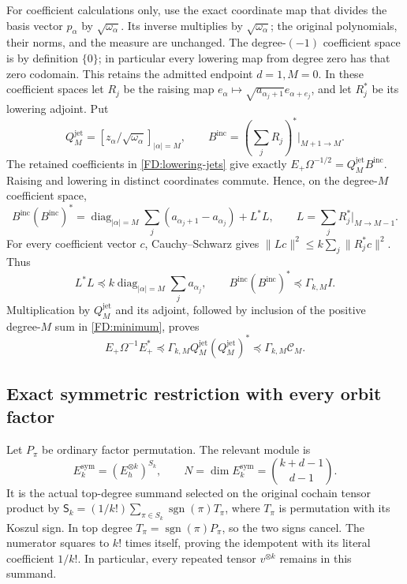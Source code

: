For coefficient calculations only, use the exact coordinate map that
divides the basis vector \(p_\alpha\) by \(\sqrt{\omega_\alpha}\).
Its inverse multiplies by \(\sqrt{\omega_\alpha}\); the original
polynomials, their norms, and the measure are unchanged.
The degree-\((-1)\) coefficient space is by definition \(\{0\}\);
in particular every lowering map from degree zero has that zero
codomain.  This retains the admitted endpoint \(d=1,M=0\).
In these coefficient spaces let \(R_j\) be the raising map
\(e_\alpha\mapsto\sqrt{a_{\alpha_j+1}}e_{\alpha+e_j}\), and let
\(R_j^*\) be its lowering adjoint.  Put
\[
Q_M^{\mathrm{jet}}=[z_\alpha/\sqrt{\omega_\alpha}]_{|\alpha|=M},
\qquad B^{\mathrm{inc}}=(\textstyle\sum_jR_j)^*\big|_{M+1\to M}.
\]
The retained coefficients in \eqref{FD:lowering-jets} give exactly
\(E_+\Omega^{-1/2}=Q_M^{\mathrm{jet}}B^{\mathrm{inc}}\).
Raising and lowering in distinct coordinates commute.  Hence, on the
degree-\(M\) coefficient space,
\[
B^{\mathrm{inc}}(B^{\mathrm{inc}})^*
=\operatorname{diag}_{|\alpha|=M}\sum_j
(a_{\alpha_j+1}-a_{\alpha_j})+L^*L,
\qquad L=\textstyle\sum_j R_j^*\big|_{M\to M-1}.
\]
For every coefficient vector \(c\), Cauchy--Schwarz gives
\(\|Lc\|^2\le k\sum_j\|R_j^*c\|^2\).  Thus
\[
L^*L\preceq k\operatorname{diag}_{|\alpha|=M}\sum_ja_{\alpha_j},
\qquad
B^{\mathrm{inc}}(B^{\mathrm{inc}})^*\preceq\Gamma_{k,M}I.
\]
Multiplication by \(Q_M^{\mathrm{jet}}\) and its adjoint, followed by
inclusion of the positive degree-\(M\) sum in \eqref{FD:minimum}, proves
\begin{equation}
E_+\Omega^{-1}E_+^*\preceq
\Gamma_{k,M}Q_M^{\mathrm{jet}}(Q_M^{\mathrm{jet}})^*
\preceq\Gamma_{k,M}\mathcal C_M.
\tag{FD.21}\label{FD:lowering-bound}
\end{equation}

\subsection{Exact symmetric restriction with every orbit factor}

Let \(P_\pi\) be ordinary factor permutation.  The relevant module is
\[
E_k^{\mathrm{sym}}=(E_h^{\otimes k})^{S_k},\qquad
N=\dim E_k^{\mathrm{sym}}=\binom{k+d-1}{d-1}.
\]
It is the actual top-degree summand selected on the original cochain
tensor product by
\(\mathsf S_k=(1/k!)\sum_{\pi\in S_k}\operatorname{sgn}(\pi)T_\pi\),
where \(T_\pi\) is permutation with its Koszul sign.
In top degree \(T_\pi=\operatorname{sgn}(\pi)P_\pi\), so the two signs
cancel.  The numerator squares to \(k!\) times itself, proving the
idempotent with its literal coefficient \(1/k!\).  In particular,
every repeated tensor \(v^{\otimes k}\) remains in this summand.

